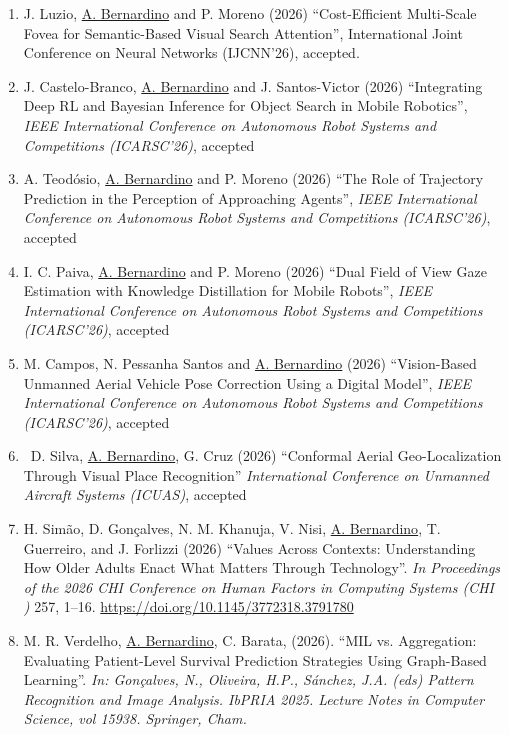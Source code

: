 \begin{enumerate}
\def\labelenumi{\arabic{enumi}.}
\item
  J. Luzio, \ul{A. Bernardino} and P. Moreno (2026) ``Cost-Efficient
  Multi-Scale Fovea for Semantic-Based Visual Search Attention'',
  International Joint Conference on Neural Networks (IJCNN'26),
  accepted.
\item
  J. Castelo-Branco, \ul{A. Bernardino} and J. Santos-Victor (2026)
  ``Integrating Deep RL and Bayesian Inference for Object Search in
  Mobile Robotics'', \emph{IEEE International Conference on Autonomous
  Robot Systems and Competitions (ICARSC'26)}, accepted
\item
  A. Teodósio, \ul{A. Bernardino} and P. Moreno (2026) ``The Role of
  Trajectory Prediction in the Perception of Approaching Agents'',
  \emph{IEEE International Conference on Autonomous Robot Systems and
  Competitions (ICARSC'26)}, accepted
\item
  I. C. Paiva, \ul{A. Bernardino} and P. Moreno (2026) ``Dual Field of
  View Gaze Estimation with Knowledge Distillation for Mobile Robots'',
  \emph{IEEE International Conference on Autonomous Robot Systems and
  Competitions (ICARSC'26)}, accepted
\item
  M. Campos, N. Pessanha Santos and \ul{A. Bernardino} (2026)
  ``Vision-Based Unmanned Aerial Vehicle Pose Correction Using a Digital
  Model'', \emph{IEEE International Conference on Autonomous Robot
  Systems and Competitions (ICARSC'26)}, accepted
\item
  ~D. Silva, \ul{A. Bernardino}, G. Cruz (2026) ``Conformal Aerial
  Geo-Localization Through Visual Place Recognition''
  \emph{International Conference on Unmanned Aircraft Systems (ICUAS)},
  accepted
\item
  H. Simão, D. Gonçalves, N. M. Khanuja, V. Nisi, \ul{A. Bernardino}, T.
  Guerreiro, and J. Forlizzi (2026) ``Values Across Contexts:
  Understanding How Older Adults Enact What Matters Through
  Technology''. \emph{In Proceedings of the 2026 CHI Conference on Human
  Factors in Computing Systems (CHI )} 257, 1--16.
  \url{https://doi.org/10.1145/3772318.3791780}
\item
  M. R. Verdelho, \ul{A. Bernardino}, C. Barata, (2026). ``MIL vs.
  Aggregation: Evaluating Patient-Level Survival Prediction Strategies
  Using Graph-Based Learning''. \emph{In: Gonçalves, N., Oliveira, H.P.,
  Sánchez, J.A. (eds) Pattern Recognition and Image Analysis. IbPRIA
  2025. Lecture Notes in Computer Science, vol 15938. Springer, Cham.}

\end{enumerate}
